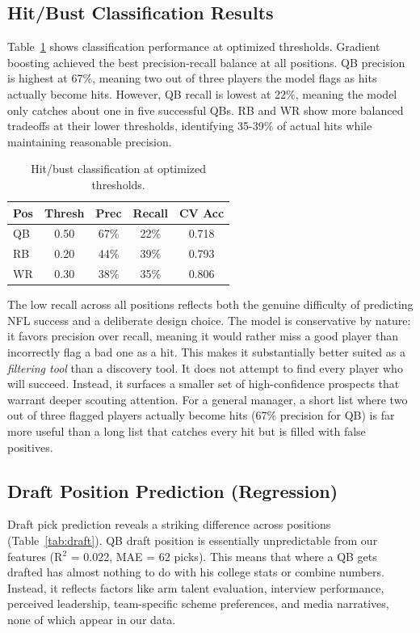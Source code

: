 \documentclass[10pt,twocolumn]{article}
\begin{document}
\subsection{Hit/Bust Classification Results}

Table~\ref{tab:class} shows classification performance at optimized thresholds. Gradient boosting achieved the best precision-recall balance at all positions. QB precision is highest at 67\%, meaning two out of three players the model flags as hits actually become hits. However, QB recall is lowest at 22\%, meaning the model only catches about one in five successful QBs. RB and WR show more balanced tradeoffs at their lower thresholds, identifying 35-39\% of actual hits while maintaining reasonable precision.

\begin{table}[H]
\centering
\small
\begin{tabular}{lcccc}
\toprule
Pos & Thresh & Prec & Recall & CV Acc \\
\midrule
QB & 0.50 & 67\% & 22\% & 0.718 \\
RB & 0.20 & 44\% & 39\% & 0.793 \\
WR & 0.30 & 38\% & 35\% & 0.806 \\
\bottomrule
\end{tabular}
\caption{Hit/bust classification at optimized thresholds.}
\label{tab:class}
\end{table}

The low recall across all positions reflects both the genuine difficulty of predicting NFL success and a deliberate design choice. The model is conservative by nature: it favors precision over recall, meaning it would rather miss a good player than incorrectly flag a bad one as a hit. This makes it substantially better suited as a \textit{filtering tool} than a discovery tool. It does not attempt to find every player who will succeed. Instead, it surfaces a smaller set of high-confidence prospects that warrant deeper scouting attention. For a general manager, a short list where two out of three flagged players actually become hits (67\% precision for QB) is far more useful than a long list that catches every hit but is filled with false positives.

\subsection{Draft Position Prediction (Regression) }

Draft pick prediction reveals a striking difference across positions (Table~\ref{tab:draft}). QB draft position is essentially unpredictable from our features (R$^2$ = 0.022, MAE = 62 picks). This means that where a QB gets drafted has almost nothing to do with his college stats or combine numbers. Instead, it reflects factors like arm talent evaluation, interview performance, perceived leadership, team-specific scheme preferences, and media narratives, none of which appear in our data.
\end{document}
